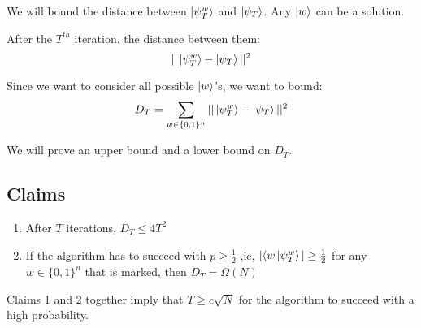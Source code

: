 \documentclass[11.5pt, paper=a4]{article}
\theoremstyle{definition}
\numberwithin{theorem}{section}
\begin{document}
We will bound the distance between $\ket{\psi_{T}^{w}}$ and $\ket{\psi_T}$. Any $\ket{w}$ can be a solution.

\vspace{5mm}
After the $T^{th}$ iteration, the distance between them:
\begin{equation}
    || \ket{\psi_{T}^{w}} - \ket{\psi_{T}} ||^2
\end{equation}

Since we want to consider all possible $\ket{w}$'s, we want to bound:
\begin{equation}
    D_T = \sum_{w \in \{0,1\}^n} || \ket{\psi_{T}^{w}} - \ket{\psi_{T}} ||^2
\end{equation}
    
We will prove an upper bound and a lower bound on $D_T$.

\subsection*{Claims}

\begin{enumerate}
    \item After $T$ iterations, $D_T \leq 4T^2$
    \item If the algorithm has to succeed with $p \geq \frac{1}{2}$ ,ie, $|\langle w \ket{\psi_{T}^{w}}| \geq \frac{1}{2}$ for any $w \in \{0,1\}^n$ that is marked, then $D_T = \Omega(N)$
\end{enumerate}

Claims 1 and 2 together imply that $T \geq c \sqrt{N}$ for the algorithm to succeed with a high probability.

% 
% 
\end{document}
